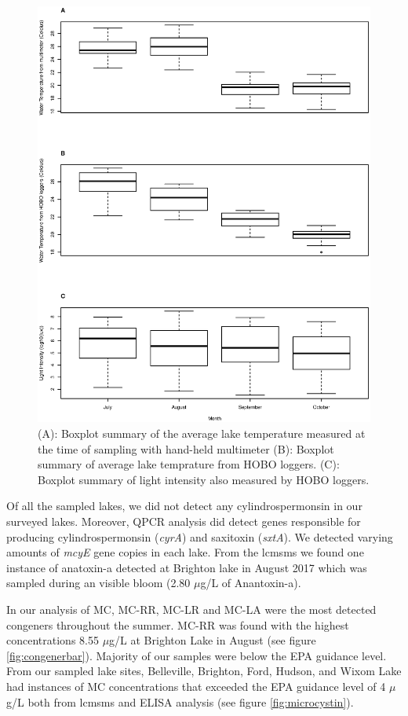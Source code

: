 \begin{figure}
\includegraphics[width=\textwidth]{figures/hobo}
\caption{
(A): Boxplot summary of the average lake temperature measured at the time of sampling with hand-held multimeter 
(B): Boxplot summary of average lake temprature from HOBO loggers. 
(C): Boxplot summary of light intensity also measured by HOBO loggers.
} 
\label{fig:hobo}
\end{figure}

Of all the sampled lakes, we did not detect any cylindrospermonsin in our surveyed lakes. Moreover,  QPCR analysis did detect genes responsible for producing cylindrospermonsin (\emph{cyrA}) and saxitoxin (\emph{sxtA}). We detected varying amounts of \emph{mcyE} gene copies in each lake.  From the \gls{lcmsms} we found one instance of anatoxin-a detected at Brighton lake in August 2017 which was sampled during an visible bloom (2.80 $\mu$g/L of Anantoxin-a).

In our analysis of MC, MC-RR, MC-LR and MC-LA were the most detected congeners throughout the summer.  MC-RR was found with the highest concentrations 8.55 $\mu$g/L at Brighton Lake in August (see figure \ref{fig:congenerbar}).  Majority of our samples were below the EPA guidance level. From our sampled lake sites, Belleville, Brighton, Ford, Hudson, and Wixom Lake had instances of MC concentrations that exceeded the EPA guidance level of 4 $\mu$g/L both from \gls{lcmsms} and ELISA analysis (see figure \ref{fig:microcystin}).

